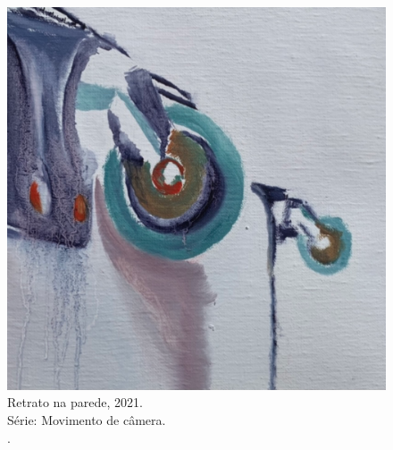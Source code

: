 \begin{figure}
\begin{minipage}{.55\linewidth}
    \includegraphics[width = .6\linewidth]{apendice/pinturas-finalizadas/boudet-retrato-na-parete.pdf}
    \caption*{Retrato na parede, 2021. \\ Série: Movimento de câmera. \\ \oleolinho. \\ }
  \end{minipage}
\end{figure}

\vfill

